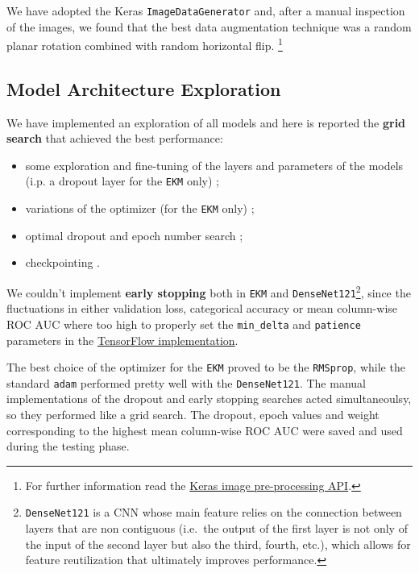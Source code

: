 \documentclass[aps,twocolumn,secnumarabic,nobalancelastpage,amsmath,amssymb,
nofootinbib]{revtex4}
\begin{document}
We have adopted the Keras \texttt{ImageDataGenerator} and, after a
manual inspection of the images, we found that the best data
augmentation technique was a random planar rotation combined with random
horizontal flip. \footnote{For further information read the
\href{https://keras.io/api/preprocessing/image/}{Keras image pre-processing API}.}

\subsection{Model Architecture Exploration}\label{exploration}

We have implemented an exploration of all models and here is
reported the \textbf{grid search} that achieved the best performance:

\begin{itemize}
\def\labelenumi{\arabic{enumi}.}
\item
some exploration and fine-tuning of the layers and parameters of the
models (i.p. a dropout layer for the \texttt{EKM} only) ;
\vspace{-0.2cm}\item
variations of the optimizer (for the \texttt{EKM} only) ;
\vspace{-0.2cm}\item
optimal dropout and epoch number search ;
\vspace{-0.2cm}\item
checkpointing .
\end{itemize}

We couldn't implement \textbf{early stopping} both in \texttt{EKM} and
\texttt{DenseNet121}\footnote{\texttt{DenseNet121}\cite{huang2016densely} is a CNN whose main feature relies on the connection between layers that are non contiguous (i.e.~the output of the first layer is not only of the input of the second layer but also the third, fourth, etc.), which allows for feature reutilization that ultimately improves performance.}, since the fluctuations in either validation loss,
categorical accuracy or mean column-wise ROC AUC where too high to
properly set the \texttt{min\_delta} and \texttt{patience} parameters in
the
\href{https://www.tensorflow.org/api_docs/python/tf/keras/callbacks/EarlyStopping}{TensorFlow
implementation}.

The best choice of the optimizer for the \texttt{EKM} proved to be the
\texttt{RMSprop}, while the standard \texttt{adam} performed pretty well
with the \texttt{DenseNet121}. The manual implementations of the dropout
and early stopping searches acted simultaneoulsy, so they performed like
a grid search. The dropout, epoch values and weight corresponding to the
highest mean column-wise ROC AUC were saved and used during the testing
phase.
\end{document}
